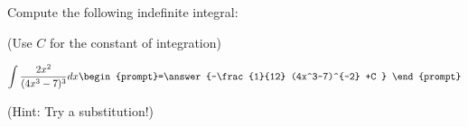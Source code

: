 \documentclass{ximera}
\author{Jim Talamo}
\begin{document}
\begin{exercise}
Compute the following indefinite integral:

\begin{prompt} (Use $C$ for the constant of integration) \end{prompt}

\[
\int \frac{2x^2}{(4x^3-7)^3} dx 
\begin{prompt}=\answer{-\frac{1}{12} (4x^3-7)^{-2} +C } \end{prompt}
\]

(Hint: Try a substitution!)
\end{exercise}
\end{document}

